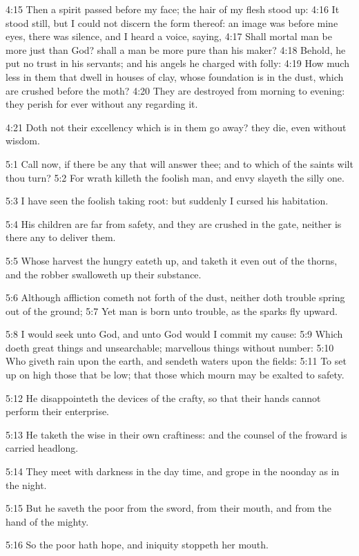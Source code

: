 4:15 Then a spirit passed before my face; the hair of my flesh stood
up: 4:16 It stood still, but I could not discern the form thereof: an
image was before mine eyes, there was silence, and I heard a voice,
saying, 4:17 Shall mortal man be more just than God? shall a man be
more pure than his maker?  4:18 Behold, he put no trust in his
servants; and his angels he charged with folly: 4:19 How much less in
them that dwell in houses of clay, whose foundation is in the dust,
which are crushed before the moth?  4:20 They are destroyed from
morning to evening: they perish for ever without any regarding it.

4:21 Doth not their excellency which is in them go away? they die,
even without wisdom.

5:1 Call now, if there be any that will answer thee; and to which of
the saints wilt thou turn?  5:2 For wrath killeth the foolish man, and
envy slayeth the silly one.

5:3 I have seen the foolish taking root: but suddenly I cursed his
habitation.

5:4 His children are far from safety, and they are crushed in the
gate, neither is there any to deliver them.

5:5 Whose harvest the hungry eateth up, and taketh it even out of the
thorns, and the robber swalloweth up their substance.

5:6 Although affliction cometh not forth of the dust, neither doth
trouble spring out of the ground; 5:7 Yet man is born unto trouble, as
the sparks fly upward.

5:8 I would seek unto God, and unto God would I commit my cause: 5:9
Which doeth great things and unsearchable; marvellous things without
number: 5:10 Who giveth rain upon the earth, and sendeth waters upon
the fields: 5:11 To set up on high those that be low; that those which
mourn may be exalted to safety.

5:12 He disappointeth the devices of the crafty, so that their hands
cannot perform their enterprise.

5:13 He taketh the wise in their own craftiness: and the counsel of
the froward is carried headlong.

5:14 They meet with darkness in the day time, and grope in the noonday
as in the night.

5:15 But he saveth the poor from the sword, from their mouth, and from
the hand of the mighty.

5:16 So the poor hath hope, and iniquity stoppeth her mouth.

